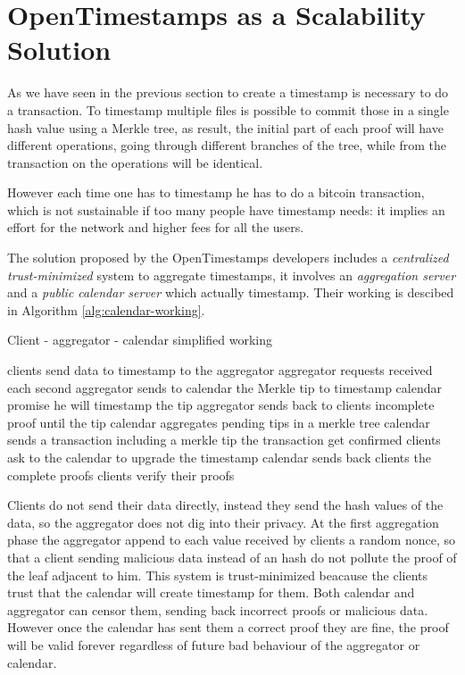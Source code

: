 \section{OpenTimestamps as a Scalability Solution}
As we have seen in the previous section to create a timestamp is necessary to do a transaction. 
To timestamp multiple files is possible to commit those in a single hash value using a Merkle tree, as result, the initial part of each proof will have different operations, going through different branches of the tree, while from the transaction on the operations will be identical.

However each time one has to timestamp he has to do a bitcoin transaction, which is not sustainable if too many people have timestamp needs: it implies an effort for the network and higher fees for all the users.

The solution proposed by the OpenTimestamps developers includes a \textit{centralized trust-minimized} system to aggregate timestamps, it involves an \textit{aggregation server} and a \textit{public calendar server} which actually timestamp.
Their working is descibed in Algorithm \ref{alg:calendar-working}.

\begin{algorithm}
	\caption{Client - aggregator - calendar simplified working}
	\label{alg:calendar-working}
	\begin{algorithmic}[1]
		\State clients send data to timestamp to the aggregator
		\State aggregator  requests received each second
		\State aggregator sends to calendar the Merkle tip to timestamp
		\State calendar promise he will timestamp the tip
		\State aggregator sends back to clients incomplete proof until the tip
		\State calendar aggregates pending tips in a merkle tree
		\State calendar sends a transaction including a merkle tip
		\State the transaction get confirmed
		\State clients ask to the calendar to upgrade the timestamp
		\State calendar sends back clients the complete proofs
		\State clients verify their proofs
	\end{algorithmic}	
\end{algorithm}

Clients do not send their data directly, instead they send the hash values of the data, so the aggregator does not dig into their privacy.
At the first aggregation phase the aggregator append to each value received by clients a random nonce, so that a client sending malicious data instead of an hash do not pollute the proof of the leaf adjacent to him.
This system is trust-minimized beacause the clients trust that the calendar will create timestamp for them. Both calendar and aggregator can censor them, sending back incorrect proofs or malicious data. However once the calendar has sent them a correct proof they are fine, the proof will be valid forever regardless of future bad behaviour of the aggregator or calendar.


